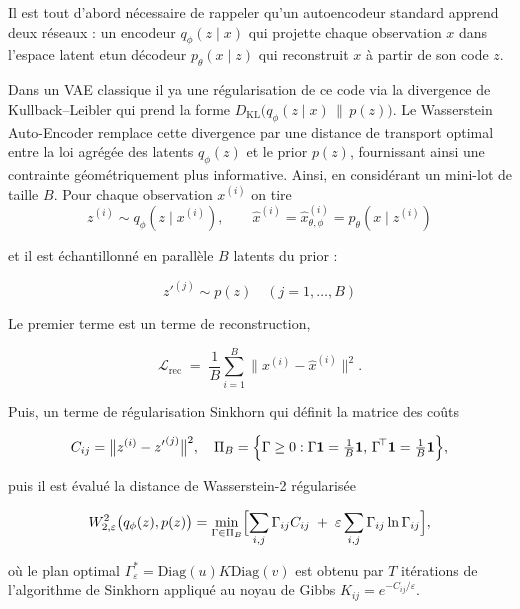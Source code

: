 Il est tout d'abord nécessaire de rappeler qu’un autoencodeur standard apprend deux réseaux : un encodeur $q_\phi(z\mid x)$ qui projette chaque observation $x$ dans l’espace latent etun décodeur $p_\theta(x\mid z)$ qui reconstruit $x$ à partir de son code $z$.

Dans un VAE classique il ya une régularisation de ce code via la divergence de Kullback–Leibler qui prend la forme $D_{\mathrm{KL}}\bigl(q_\phi(z\mid x)\,\|\,p(z)\bigr)$.
Le Wasserstein Auto-Encoder remplace cette divergence par une distance de transport optimal entre la loi agrégée des latents $q_\phi(z)$ et le prior $p(z)$, fournissant ainsi une contrainte géométriquement plus informative. Ainsi, en considérant un mini-lot de taille $B$. Pour chaque observation $x^{(i)}$ on tire
\begin{equation}
z^{(i)}\sim q_\phi(z\mid x^{(i)}), \qquad  
\widehat{x}^{(i)}=\widehat{x}^{(i)}_{\theta,\phi}=p_\theta(x\mid z^{(i)})
\end{equation}

et il est échantillonné en parallèle $B$ latents du prior :

\begin{equation}
{z'}^{(j)}\sim p(z)\quad(j=1,\dots,B)
\end{equation}

Le premier terme est un terme de reconstruction,

\begin{equation}
\mathcal{L}_{\text{rec}}
\;=\;
\frac{1}{B}\sum_{i=1}^{B}
\bigl\|x^{(i)}-\widehat{x}^{(i)}\bigr\|^{2}.
\end{equation}

Puis, un terme de régularisation Sinkhorn qui définit la matrice des coûts

\begin{equation}
C_{ij}= \bigl\|z^{(i)}-{z'}^{(j)}\bigr\|^{2},
\quad
\Pi_B=\Bigl\{\Gamma\ge0:
\Gamma\mathbf 1=\tfrac1B\mathbf 1,\,
\Gamma^{\!\top}\mathbf 1=\tfrac1B\mathbf 1\Bigr\},
\end{equation}

puis il est évalué la distance de Wasserstein-2 régularisée

\begin{equation}
W_{2,\varepsilon}^{2}\bigl(q_\phi(z),p(z)\bigr)
=\min_{\Gamma\in\Pi_B}
\Bigl[
\sum_{i,j}\Gamma_{ij}C_{ij}
\;+\;
\varepsilon\sum_{i,j}\Gamma_{ij}\ln\Gamma_{ij}
\Bigr],  
\end{equation}

où le plan optimal $\Gamma^*_\varepsilon=\mathrm{Diag}(u)K\mathrm{Diag}(v)$ est obtenu par $T$ itérations de l’algorithme de Sinkhorn appliqué au noyau de Gibbs $K_{ij}=e^{-C_{ij}/\varepsilon}$.

